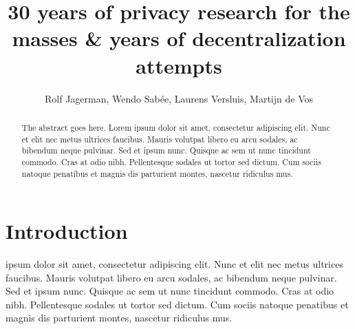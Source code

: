 \documentclass[journal]{IEEEtran}
\begin{document}


\title{30 years of privacy research for the masses \&  years of decentralization attempts}
\author{Rolf Jagerman, Wendo Sab\'ee, Laurens Versluis, Martijn de Vos}


\maketitle

\begin{abstract}
	The abstract goes here. Lorem ipsum dolor sit amet, consectetur adipiscing elit. Nunc et elit nec metus ultrices faucibus. Mauris volutpat libero eu arcu sodales, ac bibendum neque pulvinar. Sed et ipsum nunc. Quisque ac sem ut nunc tincidunt commodo. Cras at odio nibh. Pellentesque sodales ut tortor sed dictum. Cum sociis natoque penatibus et magnis dis parturient montes, nascetur ridiculus mus. 
\end{abstract}


\section{Introduction}
	 ipsum dolor sit amet, consectetur adipiscing elit. Nunc et elit nec metus ultrices faucibus. Mauris volutpat libero eu arcu sodales, ac bibendum neque pulvinar. Sed et ipsum nunc. Quisque ac sem ut nunc tincidunt commodo. Cras at odio nibh. Pellentesque sodales ut tortor sed dictum. Cum sociis natoque penatibus et magnis dis parturient montes, nascetur ridiculus mus.
		
\end{document}
